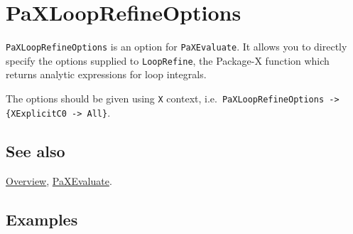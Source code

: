 \documentclass[../FeynHelpersManual.tex]{subfiles}
\begin{document}
\hypertarget{paxlooprefineoptions}{
\section{PaXLoopRefineOptions}\label{paxlooprefineoptions}}

\texttt{PaXLoopRefineOptions} is an option for \texttt{PaXEvaluate}. It
allows you to directly specify the options supplied to
\texttt{LoopRefine}, the Package-X function which returns analytic
expressions for loop integrals.

The options should be given using \texttt{X\textasciigrave } context,
i.e.~\texttt{PaXLoopRefineOptions -> \{\allowbreak{}X\textasciigrave ExplicitC0 -> All\}}.

\subsection{See also}

\hyperlink{toc}{Overview}, \hyperlink{paxevaluate}{PaXEvaluate}.

\subsection{Examples}
\end{document}

